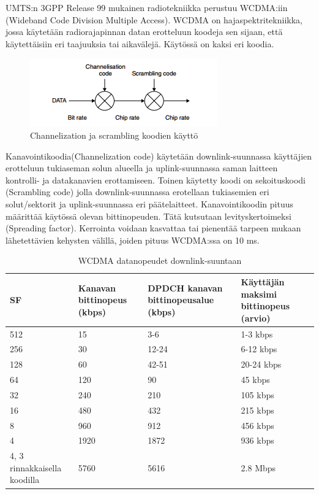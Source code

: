 \documentclass[11pt,a4paper,oneside,article,finnish]{memoir}
\begin{document}
UMTS:n 3GPP Release 99 mukainen radiotekniikka perustuu WCDMA:iin (Wideband Code Division Multiple Access). WCDMA on hajaspektritekniikka, jossa käytetään radiorajapinnan datan erotteluun koodeja sen sijaan, että käytettäisiin eri taajuuksia tai aikavälejä. Käytössä on kaksi eri koodia. 
\begin{figure}[H]
	\centering
	\includegraphics{umtscodes}
	\caption{Channelization ja scrambling koodien käyttö}
	\label{fig:umtscodes}
\end{figure}
Kanavointikoodia(Channelization code) käytetään downlink-suunnassa käyttäjien erotteluun tukiaseman solun alueella ja uplink-suunnassa saman laitteen kontrolli- ja datakanavien erottamiseen. Toinen käytetty koodi on sekoituskoodi (Scrambling code) jolla downlink-suunnassa erotellaan tukiasemien eri solut/sektorit ja uplink-suunnassa eri päätelaitteet. Kanavointikoodin pituus määrittää käytössä olevan bittinopeuden. Tätä kutsutaan levityskertoimeksi (Spreading factor). Kerrointa voidaan kasvattaa tai pienentää tarpeen mukaan lähetettävien kehysten välillä, joiden pituus WCDMA:ssa on 10 ms.
\begin{table}[H]
	\centering
	\caption{WCDMA datanopeudet downlink-suuntaan}
	\begin{tabularx}{.95\textwidth}{|X|X|X|X|}
		\hline
		SF & Kanavan bittinopeus (kbps)& DPDCH kanavan bittinopeusalue (kbps) & Käyttäjän maksimi bittinopeus (arvio) \\
    		\hline
		512 & 15 & 3-6 & 1-3 kbps \\
		256 & 30 & 12-24 & 6-12 kbps \\
		128 & 60 & 42-51 & 20-24 kbps \\
		64 & 120 & 90 & 45 kbps \\
		32 & 240 & 210 & 105 kbps \\
		16 & 480 & 432 & 215 kbps \\
		8 & 960 & 912 & 456 kbps \\
		4 & 1920 & 1872 & 936 kbps \\
		4, 3 rinnakkaisella koodilla & 5760 & 5616 & 2.8 Mbps \\
    		\hline
	\end{tabularx}
	\label{table:wcdmadatanopeudet}
\end{table}
\end{document}
